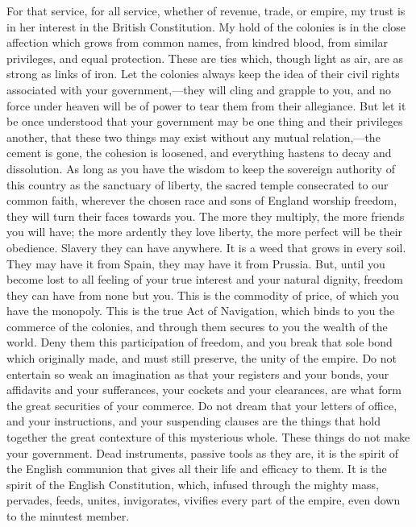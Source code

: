 For that service, for all service, whether of revenue, trade, or empire, my trust is in her interest in the British Constitution. My hold of the colonies is in the close affection which grows from common names, from kindred blood, from similar privileges, and equal protection. These are ties which, though light as air, are as strong as links of iron. Let the colonies always keep the idea of their civil rights associated with your government,—they will cling and grapple to you, and no force under heaven will be of power to tear them from their allegiance. But let it be once understood that your government may be one thing and their privileges another, that these two things may exist without any mutual relation,—the cement is gone, the cohesion is loosened, and everything hastens to decay and dissolution. As long as you have the wisdom to keep the sovereign authority of this country as the sanctuary of liberty, the sacred temple consecrated to our common faith, wherever the chosen race and sons of England worship freedom, they will turn their faces towards you. The more they multiply, the more friends you will have; the more ardently they love liberty, the more perfect will be their obedience. Slavery they can have anywhere. It is a weed that grows in every soil. They may have it from Spain, they may have it from Prussia. But, until you become lost to all feeling of your true interest and your natural dignity, freedom they can have from none but you. This is the commodity of price, of which you have the monopoly. This is the true Act of Navigation, which binds to you the commerce of the colonies, and through them secures to you the wealth of the world. Deny them this participation of freedom, and you break that sole bond which originally made, and must still preserve, the unity of the empire. Do not entertain so weak an imagination as that your registers and your bonds, your affidavits and your sufferances, your cockets and your clearances, are what form the great securities of your commerce. Do not dream that your letters of office, and your instructions, and your suspending clauses are the things that hold together the great contexture of this mysterious whole. These things do not make your government. Dead instruments, passive tools as they are, it is the spirit of the English communion that gives all their life and efficacy to them. It is the spirit of the English Constitution, which, infused through the mighty mass, pervades, feeds, unites, invigorates, vivifies every part of the empire, even down to the minutest member.

